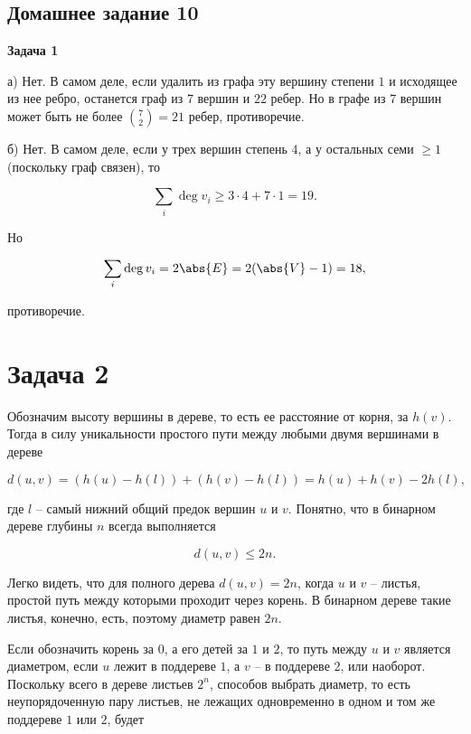 \subsection{Домашнее задание 10}

	\begin{center}
    \textbf{Задача 1}
\end{center}

	а) Нет. В самом деле, если удалить из графа эту вершину степени $1$ и исходящее из нее ребро, останется граф из $7$ вершин и $22$ ребер. Но в графе из $7$ вершин может быть не более $\binom{7}{2} = 21$ ребер, противоречие.

	б) Нет. В самом деле, если у трех вершин степень $4$, а у остальных семи $\ge 1$ (поскольку граф связен), то

	\begin{equation*}
		\sum_i \deg v_i \ge 3 \cdot 4 + 7 \cdot 1 = 19.
	\end{equation*}

	Но

	\begin{equation*}
		\sum_i \deg v_i = 2 \abs{E} = 2 (\abs{V} - 1) = 18,
	\end{equation*}

	противоречие.


	\section*{Задача 2}

	Обозначим высоту вершины в дереве, то есть ее расстояние от корня, за $h(v)$. Тогда в силу уникальности простого пути между любыми двумя вершинами в дереве

	\begin{equation*}
		d(u, v) = (h(u) - h(l)) + (h(v) - h(l)) = h(u) + h(v) - 2 h(l),
	\end{equation*}

	где $l$ -- самый нижний общий предок вершин $u$ и $v$. Понятно, что в бинарном дереве глубины $n$ всегда выполняется

	\begin{equation*}
		d(u, v) \le 2n.
	\end{equation*}

	Легко видеть, что для полного дерева $d(u, v) = 2n$, когда $u$ и $v$ -- листья, простой путь между которыми проходит через корень. В бинарном дереве такие листья, конечно, есть, поэтому диаметр равен $2n$.

	Если обозначить корень за $0$, а его детей за $1$ и $2$, то путь между $u$ и $v$ является диаметром, если $u$ лежит в поддереве $1$, а $v$ -- в поддереве $2$, или наоборот. Поскольку всего в дереве листьев $2^n$, способов выбрать диаметр, то есть неупорядоченную пару листьев, не лежащих одновременно в одном и том же поддереве $1$ или $2$, будет

